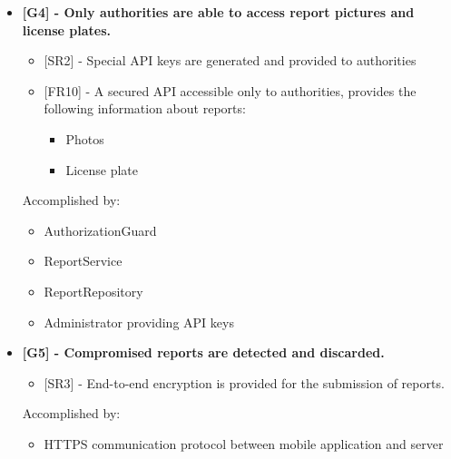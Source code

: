 \begin{itemize}[label={}]
    \item \textbf{[G4] - Only authorities are able to access report pictures and license plates.}
        \begin{itemize}[label={}]
            \item {[SR2]} - Special API keys are generated and provided to authorities
            \item {[FR10]} - A secured API accessible only to authorities, provides the following information about reports:
            \begin{itemize}[label={\textbullet}]
                \item Photos
                \item License plate
            \end{itemize}
        \end{itemize}
        Accomplished by:
        \begin{itemize}[label={\textbullet}]
            \item AuthorizationGuard
            \item ReportService
            \item ReportRepository
            \item Administrator providing API keys
        \end{itemize}

    \item \textbf{[G5] - Compromised reports are detected and discarded.}
        \begin{itemize}[label={}]
            \item {[SR3]} - End-to-end encryption is provided for the submission of reports. 
        \end{itemize}
        Accomplished by:
        \begin{itemize}[label={\textbullet}]
            \item HTTPS communication protocol between mobile application and server
        \end{itemize}


\end{itemize}
